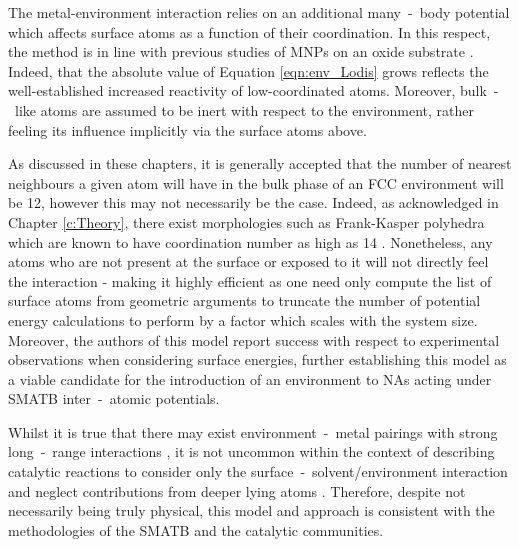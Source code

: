The metal-environment interaction relies on an additional many~-~body potential which affects surface atoms as a function of their coordination. In this respect, the method is in line with previous studies of MNPs on an oxide substrate \cite{PhysRevB.65.245411,10.1063/1.3077300,PhysRevB.79.165438,PhysRevB.81.155443}. Indeed, that the absolute value of Equation \ref{eqn:env_Lodis} grows reflects the well-established increased reactivity of low-coordinated atoms. Moreover, bulk~-~like atoms are assumed to be inert with respect to the environment, rather feeling its influence implicitly via the surface atoms above.

As discussed in these chapters, it is generally accepted that the number of nearest neighbours a given atom will have in the bulk phase of an FCC environment will be 12, however this may not necessarily be the case. Indeed, as acknowledged in Chapter \ref{c:Theory}, there exist morphologies such as Frank-Kasper polyhedra \cite{https://doi.org/10.1107/S0365110X59001499} which are known to have coordination number as high as 14 \cite{Shoemaker:a25444,NELSON19891,doi:10.1073/pnas.1809655115}. Nonetheless, any atoms who are not present at the surface or exposed to it will not directly feel the interaction - making it highly efficient as one need only compute the list of surface atoms from geometric arguments to truncate the number of potential energy calculations to perform by a factor which scales with the system size. Moreover, the authors of this model report success with respect to experimental observations when considering surface energies, further establishing this model as a viable candidate for the introduction of an environment to NAs acting under SMATB inter~-~atomic potentials.

Whilst it is true that there may exist environment~-~metal pairings with strong long~-~range interactions \cite{doi:10.1021/jp0609941}, it is not uncommon within the context of describing catalytic reactions to consider only the surface~-~solvent/environment interaction and neglect contributions from deeper lying atoms \cite{Rossi2020}. Therefore, despite not necessarily being truly physical, this model and approach is consistent with the methodologies of the SMATB and the catalytic communities.

